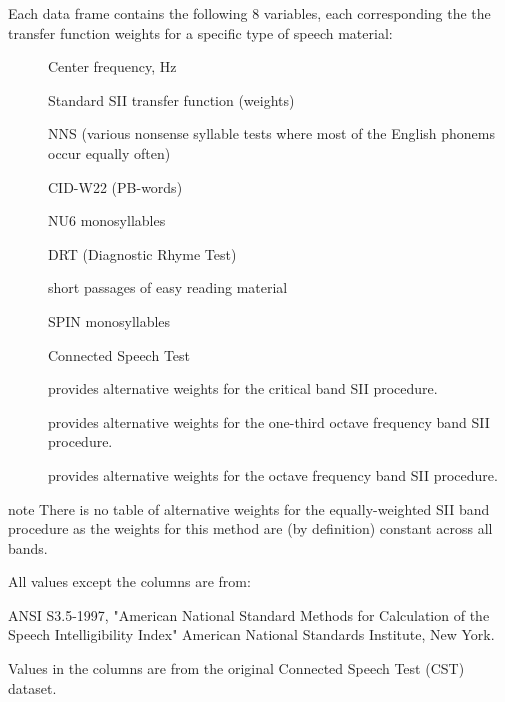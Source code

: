 \documentclass[letterpaper]{book}
\begin{document}
\begin{Format}
Each data frame  contains the following 8 variables, each
corresponding the the transfer function weights for a specific type of
speech material:
\begin{description}

\item[] Center frequency, Hz
\item[] Standard SII transfer function (weights)
\item[] NNS (various nonsense syllable tests where
most of the English phonems occur equally often)
\item[] CID-W22 (PB-words)
\item[] NU6 monosyllables
\item[] DRT (Diagnostic Rhyme Test)
\item[] short passages of easy reading material
\item[] SPIN monosyllables
\item[] Connected Speech Test

\end{description}

\end{Format}
%
\begin{Details}
\begin{description}

\item[] provides alternative weights for the
critical band SII procedure.
\item[] provides alternative weights for the
one-third octave frequency band SII procedure.
\item[] provides alternative weights for the
octave frequency band SII procedure.

\end{description}

\end{Details}
%
\begin{Section}{note}
There is no table of alternative weights for the
equally-weighted SII band procedure as the weights for this method are
(by definition) constant across all bands.

\end{Section}
%
\begin{Source}
All values except the  columns are from:

ANSI S3.5-1997, "American National Standard Methods for 
Calculation of the Speech Intelligibility Index" American National
Standards Institute, New York. 

Values in the  columns are from the original Connected Speech Test (CST) dataset.
\end{Source}
\end{document}
